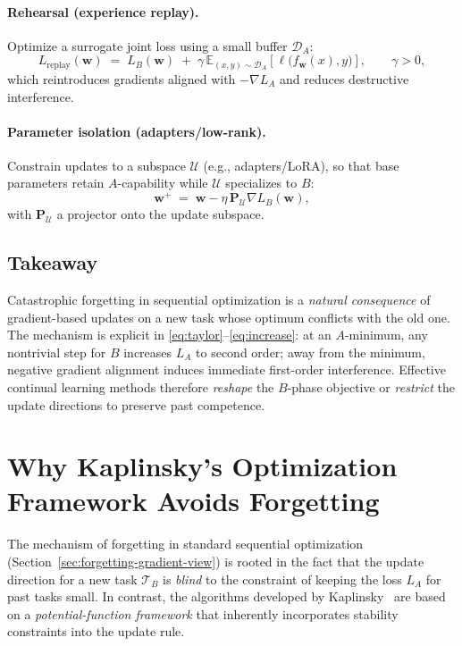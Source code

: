 \documentclass[12pt]{article}
\begin{document}
\paragraph{Rehearsal (experience replay).}
Optimize a surrogate joint loss using a small buffer $\mathcal{D}_A$:
\begin{equation}
L_{\text{replay}}(\mathbf{w}) \;=\;
L_B(\mathbf{w}) \;+\; \gamma\, \mathbb{E}_{(x,y)\sim \mathcal{D}_A}
\!\left[\ell\big(f_{\mathbf{w}}(x),y\big)\right], \qquad \gamma>0,
\end{equation}
which reintroduces gradients aligned with $-\nabla L_A$ and reduces destructive interference.

\paragraph{Parameter isolation (adapters/low-rank).}
Constrain updates to a subspace $\mathcal{U}$ (e.g., adapters/LoRA), so that base parameters retain
$A$-capability while $\mathcal{U}$ specializes to $B$:
\begin{equation}
\mathbf{w}^{+} \;=\; \mathbf{w} - \eta\, \mathbf{P}_{\mathcal{U}} \nabla L_B(\mathbf{w}),
\end{equation}
with $\mathbf{P}_{\mathcal{U}}$ a projector onto the update subspace.

\subsection{Takeaway}
Catastrophic forgetting in sequential optimization is a \emph{natural consequence} of gradient-based
updates on a new task whose optimum conflicts with the old one. The mechanism is explicit in
\eqref{eq:taylor}--\eqref{eq:increase}: at an $A$-minimum, any nontrivial step for $B$ increases $L_A$
to second order; away from the minimum, negative gradient alignment induces immediate first-order
interference. Effective continual learning methods therefore \emph{reshape} the $B$-phase objective or
\emph{restrict} the update directions to preserve past competence.

\section{Why Kaplinsky's Optimization Framework Avoids Forgetting}
\label{sec:kaplinsky-no-forgetting}

The mechanism of forgetting in standard sequential optimization
(Section~\ref{sec:forgetting-gradient-view}) is rooted in the fact that the
update direction for a new task $\mathcal{T}_B$ is \emph{blind} to the constraint of
keeping the loss $L_A$ for past tasks small. In contrast, the algorithms
developed by Kaplinsky~\cite{KaplinskyPesin2018} are based on a
\emph{potential-function framework} that inherently incorporates stability
constraints into the update rule.
\end{document}
